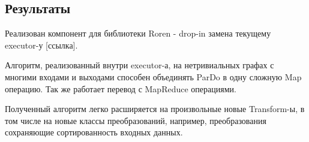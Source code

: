 \subsection{Результаты}

Реализован компонент для библиотеки Roren - drop-in замена текущему executor-у [ссылка].

Алгоритм, реализованный внутри executor-а, на нетривиальных графах с многими входами и выходами способен объединять ParDo в одну сложную Map операцию. Так же работает перевод с MapReduce операциями.

Полученный алгоритм легко расширяется на произвольные новые Transform-ы, в том числе на новые классы преобразований, например, преобразования сохраняющие сортированность входных данных.
